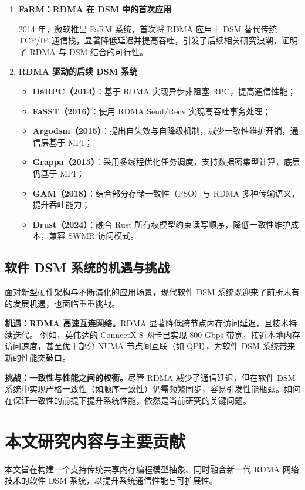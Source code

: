 {\begin{enumerate}[leftmargin=1em, align=left]
    \item \textbf{FaRM：RDMA 在 DSM 中的首次应用}

          2014 年，微软推出 FaRM\citep{drago2014farm} 系统，首次将 RDMA 应用于 DSM 替代传统 TCP/IP 通信栈，显著降低延迟并提高吞吐，引发了后续相关研究浪潮，证明了 RDMA 与 DSM 结合的可行性。

    \item \textbf{RDMA 驱动的后续 DSM 系统}
          \begin{itemize}
            \item \textbf{DaRPC（2014）}：基于 RDMA 实现异步非阻塞 RPC，提高通信性能；
            \item \textbf{FaSST（2016）}：使用 RDMA Send/Recv 实现高吞吐事务处理；
            \item \textbf{Argodsm（2015）}：提出自失效与自降级机制，减少一致性维护开销，通信层基于 MPI；
            \item \textbf{Grappa（2015）}：采用多线程优化任务调度，支持数据密集型计算，底层仍基于 MPI；
            \item \textbf{GAM（2018）}：结合部分存储一致性（PSO）与 RDMA 多种传输语义，提升吞吐能力；
            \item \textbf{Drust（2024）}：融合 Rust 所有权模型约束读写顺序，降低一致性维护成本，兼容 SWMR 访问模式。
          \end{itemize}

  \end{enumerate}

  \subsection{软件 DSM 系统的机遇与挑战}
  面对新型硬件架构与不断演化的应用场景，现代软件 DSM 系统既迎来了前所未有的发展机遇，也面临重重挑战。

  \textbf{机遇：RDMA 高速互连网络。}RDMA 显著降低跨节点内存访问延迟，且技术持续迭代。
  例如，英伟达的 ConnectX-8 网卡已实现 800 Gbps 带宽，接近本地内存访问速度，甚至优于部分 NUMA 节点间互联（如 QPI），为软件 DSM 系统带来新的性能突破口。

  \textbf{挑战：一致性与性能之间的权衡。}尽管 RDMA 减少了通信延迟，但在软件 DSM 系统中实现严格一致性（如顺序一致性）仍需频繁同步，容易引发性能瓶颈。如何在保证一致性的前提下提升系统性能，依然是当前研究的关键问题。

  \section{本文研究内容与主要贡献}
  本文旨在构建一个支持传统共享内存编程模型抽象、同时融合新一代 RDMA 网络技术的软件 DSM 系统，以提升系统通信性能与可扩展性。

}
